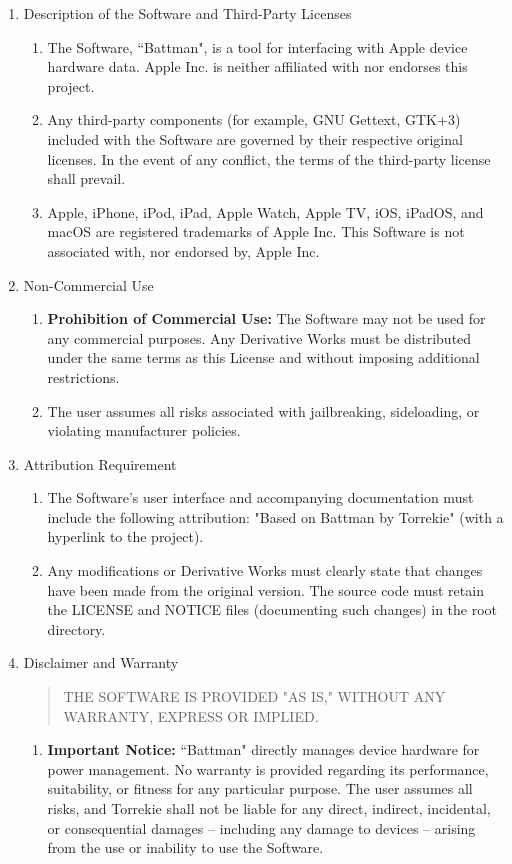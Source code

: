 \documentclass{article}
\begin{document}
\begin{enumerate}
\begin{enumerate}
	\end{enumerate}
	\item Description of the Software and Third-Party Licenses
	\begin{enumerate}
		\item The Software, ``Battman", is a tool for interfacing with Apple device hardware data. Apple Inc. is neither affiliated with nor endorses this project.
		\item Any third-party components (for example, GNU Gettext, GTK+3) included with the Software are governed by their respective original licenses. In the event of any conflict, the terms of the third-party license shall prevail.
		\item Apple, iPhone, iPod, iPad, Apple Watch, Apple TV, iOS, iPadOS, and macOS are registered trademarks of Apple Inc. This Software is not associated with, nor endorsed by, Apple Inc.
	\end{enumerate}
	\item Non-Commercial Use
	\begin{enumerate}
		\item \textbf{Prohibition of Commercial Use:} The Software may not be used for any commercial purposes. Any Derivative Works must be distributed under the same terms as this License and without imposing additional restrictions.
		\item The user assumes all risks associated with jailbreaking, sideloading, or violating manufacturer policies.
	\end{enumerate}
	\item Attribution Requirement
	\begin{enumerate}
		\item The Software’s user interface and accompanying documentation must include the following attribution: "Based on Battman by Torrekie" (with a hyperlink to the project).
		\item Any modifications or Derivative Works must clearly state that changes have been made from the original version. The source code must retain the LICENSE and NOTICE files (documenting such changes) in the root directory.
	\end{enumerate}
	\item Disclaimer and Warranty
	\begin{quote}THE SOFTWARE IS PROVIDED "AS IS," WITHOUT ANY WARRANTY, EXPRESS OR IMPLIED.\end{quote}
	\begin{enumerate}
		\item \textbf{Important Notice:} ``Battman" directly manages device hardware for power management. No warranty is provided regarding its performance, suitability, or fitness for any particular purpose. The user assumes all risks, and Torrekie shall not be liable for any direct, indirect, incidental, or consequential damages – including any damage to devices – arising from the use or inability to use the Software.

\end{enumerate}
\end{enumerate}
\end{document}
